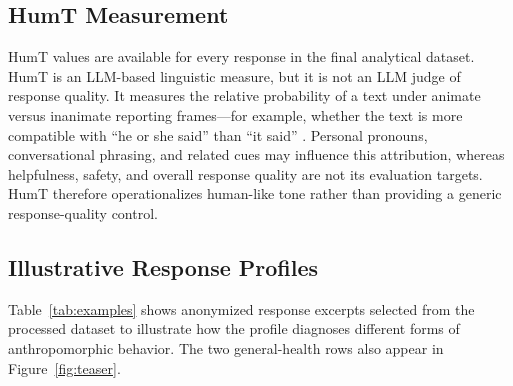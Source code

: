 \documentclass[manuscript,review,anonymous]{acmart}
\begin{document}
\subsection{HumT Measurement}

HumT values are available for every response in the final analytical dataset. HumT is an LLM-based linguistic measure, but it is not an LLM judge of response quality. It measures the relative probability of a text under animate versus inanimate reporting frames---for example, whether the text is more compatible with ``he or she said'' than ``it said'' \cite{cheng2025}. Personal pronouns, conversational phrasing, and related cues may influence this attribution, whereas helpfulness, safety, and overall response quality are not its evaluation targets. HumT therefore operationalizes human-like tone rather than providing a generic response-quality control.

\subsection{Illustrative Response Profiles}
Table~\ref{tab:examples} shows anonymized response excerpts selected from the processed dataset to illustrate how the profile diagnoses different forms of anthropomorphic behavior. The two general-health rows also appear in Figure~\ref{fig:teaser}.
\end{document}
